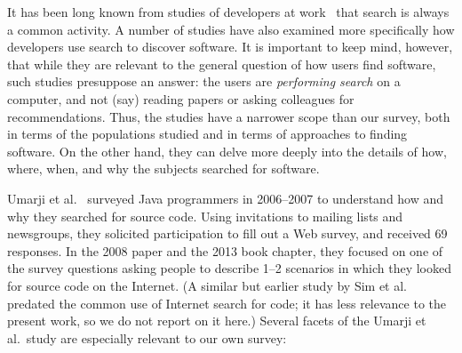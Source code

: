 \documentclass{casicswhitepaper}
\begin{document}
It has been long known from studies of developers at work~\cite[e.g.,][]{singer1997examination} that search is always a common activity.  A number of studies have also examined more specifically how developers use search to discover software.  It is important to keep mind, however, that while they are relevant to the general question of how users find software, such studies presuppose an answer: the users are \emph{performing search} on a computer, and not (say) reading papers or asking colleagues for recommendations.  Thus, the studies have a narrower scope than our survey, both in terms of the populations studied and in terms of approaches to finding software.  On the other hand, they can delve more deeply into the details of how, where, when, and why the subjects searched for software.

Umarji et al.~\cite{umarji_2008, umarji_2013} surveyed Java programmers in 2006--2007 to understand how and why they searched for source code.  Using invitations to mailing lists and newsgroups, they solicited participation to fill out a Web survey, and received 69 responses.  In the 2008 paper and the 2013 book chapter, they focused on one of the survey questions asking people to describe 1--2 scenarios in which they looked for source code on the Internet.  (A similar but earlier study by Sim et al.~\cite{sim_1998} predated the common use of Internet search for code; it has less relevance to the present work, so we do not report on it here.)  Several facets of the Umarji et al.\ study are especially relevant to our own survey:
\end{document}
